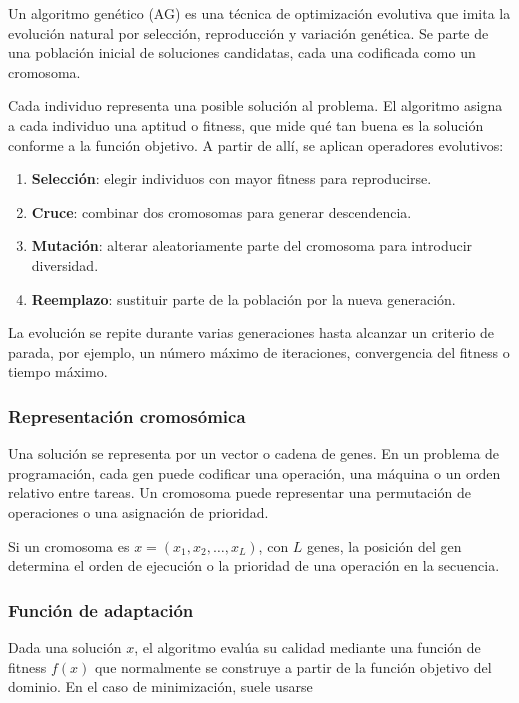 \documentclass[11pt,a4paper]{article}
\begin{document}
Un algoritmo genético (AG) es una técnica de optimización evolutiva que imita la evolución natural por selección, reproducción y variación genética. Se parte de una población inicial de soluciones candidatas, cada una codificada como un cromosoma.

Cada individuo representa una posible solución al problema. El algoritmo asigna a cada individuo una aptitud o fitness, que mide qué tan buena es la solución conforme a la función objetivo. A partir de allí, se aplican operadores evolutivos:

\begin{enumerate}
    \item \textbf{Selección}: elegir individuos con mayor fitness para reproducirse.
    \item \textbf{Cruce}: combinar dos cromosomas para generar descendencia.
    \item \textbf{Mutación}: alterar aleatoriamente parte del cromosoma para introducir diversidad.
    \item \textbf{Reemplazo}: sustituir parte de la población por la nueva generación.
\end{enumerate}

La evolución se repite durante varias generaciones hasta alcanzar un criterio de parada, por ejemplo, un número máximo de iteraciones, convergencia del fitness o tiempo máximo.

\subsubsection{Representación cromosómica}

Una solución se representa por un vector o cadena de genes. En un problema de programación, cada gen puede codificar una operación, una máquina o un orden relativo entre tareas. Un cromosoma puede representar una permutación de operaciones o una asignación de prioridad.

Si un cromosoma es $x = (x_1, x_2, \dots, x_L)$, con $L$ genes, la posición del gen determina el orden de ejecución o la prioridad de una operación en la secuencia.

\subsubsection{Función de adaptación}

Dada una solución $x$, el algoritmo evalúa su calidad mediante una función de fitness $f(x)$ que normalmente se construye a partir de la función objetivo del dominio. En el caso de minimización, suele usarse
\end{document}
